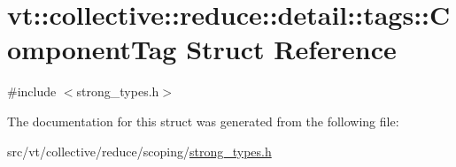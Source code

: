 \hypertarget{structvt_1_1collective_1_1reduce_1_1detail_1_1tags_1_1_component_tag}{}\section{vt\+:\+:collective\+:\+:reduce\+:\+:detail\+:\+:tags\+:\+:Component\+Tag Struct Reference}
\label{structvt_1_1collective_1_1reduce_1_1detail_1_1tags_1_1_component_tag}


{\ttfamily \#include $<$strong\+\_\+types.\+h$>$}



The documentation for this struct was generated from the following file\+:\begin{DoxyCompactItemize}
\item 
src/vt/collective/reduce/scoping/\hyperlink{strong__types_8h}{strong\+\_\+types.\+h}\end{DoxyCompactItemize}
